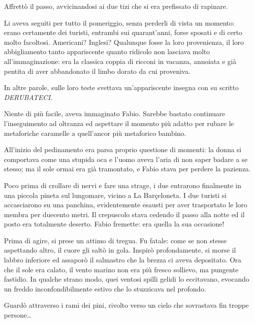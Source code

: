 Affrettò il passo, avvicinandosi ai due tizi che si era prefissato di rapinare. 

Li aveva seguiti per tutto il pomeriggio, senza perderli di vista un momento: erano certamente dei turisti, entrambi sui quarant'anni, forse sposati e di certo molto facoltosi. Americani? Inglesi? Qualunque fosse la loro provenienza, il loro abbigliamento tanto appariscente quanto ridicolo non lasciava molto all'immaginazione: era la classica coppia di ricconi in vacanza, annoiata e già pentita di aver abbandonato il limbo dorato da cui proveniva. 

In altre parole, sulle loro teste svettava un'appariscente insegna con su scritto \textit{DERUBATECI}. 

Niente di più facile, aveva immaginato Fabio. Sarebbe bastato continuare l'inseguimento ad oltranza ed aspettare il momento più adatto per rubare le metaforiche caramelle a quell'ancor più metaforico bambino. 

All'inizio del pedinamento era parsa proprio questione di momenti: la donna si comportava come una stupida oca e l'uomo aveva l'aria di non saper badare a se stesso; ma il sole ormai era già tramontato, e Fabio stava per perdere la pazienza.

Poco prima di crollare di nervi e fare una strage, i due entrarono finalmente in una piccola pineta sul lungomare, vicino a La Barçeloneta. I due turisti si accasciarono su una panchina, evidentemente esausti per aver trasportato le loro membra per duecento metri. Il crepuscolo stava cedendo il passo alla notte ed il posto era totalmente deserto. Fabio fremette: era quella la sua occasione!

Prima di agire, si prese un attimo di tregua. Fu fatale: come se non stesse aspettando altro, il cuore gli saltò in gola. Inspirò profondamente, si morse il labbro inferiore ed assaporò il salmastro che la brezza ci aveva depositato. Ora che il sole era calato, il vento marino non era più fresco sollievo, ma pungente fastidio. In qualche strano modo, quei ventosi spilli gelidi lo eccitavano, evocando un freddo inconfondibilmente estivo che lo stuzzicava nel profondo. 

Guardò attraverso i rami dei pini, rivolto verso un cielo che sovrastava fin troppe persone\ldots

